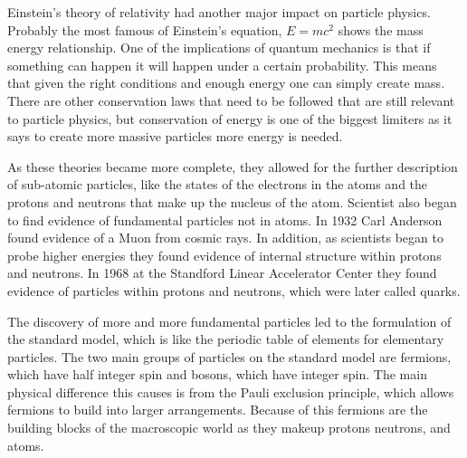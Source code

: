 Einstein's theory of relativity had another major impact on particle physics. Probably the most famous of Einstein's equation, $E = mc^2$ shows the mass energy relationship. One of the implications of quantum mechanics is that if something can happen it will happen under a certain probability. This means that given the right conditions and enough energy one can simply create mass. There are other conservation laws that need to be followed that are still relevant to particle physics, but conservation of energy is one of the biggest limiters as it says to create more massive particles more energy is needed. 

As these theories became more complete, they allowed for the further description of sub-atomic particles, like the states of the electrons in the atoms and the protons and neutrons that make up the nucleus of the atom. Scientist also began to find evidence of fundamental particles not in atoms. In 1932 Carl Anderson found evidence of a Muon from cosmic rays. In addition, as scientists began to probe higher energies they found evidence of internal structure within protons and neutrons. In 1968 at the Standford Linear Accelerator Center they found evidence of particles within protons and neutrons, which were later called quarks.

The discovery of more and more fundamental particles led to the formulation of the standard model, which is like the periodic table of elements for elementary particles. The two main groups of particles on the standard model are fermions, which have half integer spin and bosons, which have integer spin. The main physical difference this causes is from the Pauli exclusion principle, which allows fermions to build into larger arrangements. Because of this fermions are the building blocks of the macroscopic world as they makeup protons neutrons, and atoms.   

